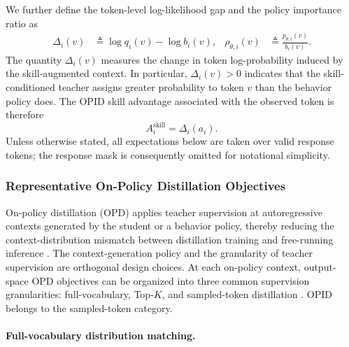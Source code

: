 We further define the token-level log-likelihood gap and the policy importance
ratio as
\begin{equation}
\begin{aligned}
 \Delta_i(v) &\triangleq \log q_i(v)-\log b_i(v),
 & \rho_{\theta,i}(v) &\triangleq
 \frac{p_{\theta,i}(v)}{b_i(v)}.
\end{aligned}
\label{eq:gap_ratio}
\end{equation}
The quantity \(\Delta_i(v)\) measures the change in token log-probability
induced by the skill-augmented context. In particular,
\(\Delta_i(v)>0\) indicates that the skill-conditioned teacher assigns greater
probability to token \(v\) than the behavior policy does. The OPID skill
advantage associated with the observed token is therefore
\[
A_i^{\mathrm{skill}}=\Delta_i(a_i).
\]
Unless otherwise stated, all expectations below are taken over valid response
tokens; the response mask is consequently omitted for notational simplicity.

\subsubsection{Representative On-Policy Distillation Objectives}

On-policy distillation (OPD) applies teacher supervision at autoregressive
contexts generated by the student or a behavior policy, thereby reducing the
context-distribution mismatch between distillation training and free-running
inference \citep{agarwal2024onpolicy}. The context-generation policy and the
granularity of teacher supervision are orthogonal design choices. At each
on-policy context, output-space OPD objectives can be organized into three
common supervision granularities: full-vocabulary, Top-$K$, and sampled-token
distillation \citep{li2026rethinkingopd,fu2026revisitingopd}. OPID belongs to
the sampled-token category.

\paragraph{Full-vocabulary distribution matching.}


